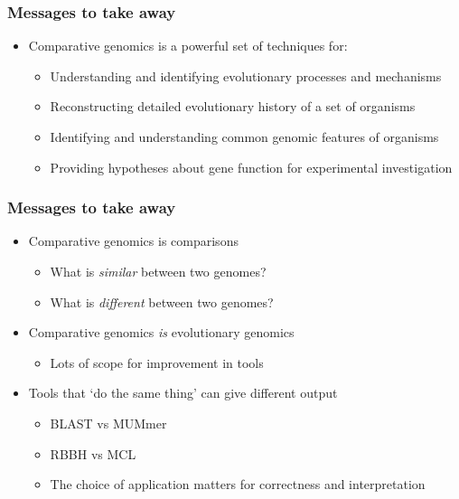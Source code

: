 \begin{frame}
  \frametitle{Messages to take away}
  \begin{itemize}
    \item   \textcolor{hutton_green}{Comparative genomics is a powerful set of techniques for:}
    \begin{itemize}
      \item Understanding and identifying evolutionary processes and mechanisms
      \item Reconstructing detailed evolutionary history of a set of organisms
      \item Identifying and understanding common genomic features of organisms
      \item Providing hypotheses about gene function for experimental investigation
    \end{itemize}
  \end{itemize}
\end{frame}

\begin{frame}
  \frametitle{Messages to take away}
  \begin{itemize}
    \item \textcolor{hutton_green}{Comparative genomics is comparisons}
    \begin{itemize}
      \item What is \textit{similar} between two genomes?
      \item What is \textit{different} between two genomes?
    \end{itemize}
    \item \textcolor{hutton_blue}{Comparative genomics \textit{is} evolutionary genomics}
    \begin{itemize}
      \item Lots of scope for improvement in tools
    \end{itemize}
    \item \textcolor{hutton_purple}{Tools that `do the same thing' can give different output}
    \begin{itemize}
      \item BLAST vs MUMmer
      \item RBBH vs MCL
      \item The choice of application matters for correctness and interpretation
    \end{itemize}
  \end{itemize}
\end{frame}
